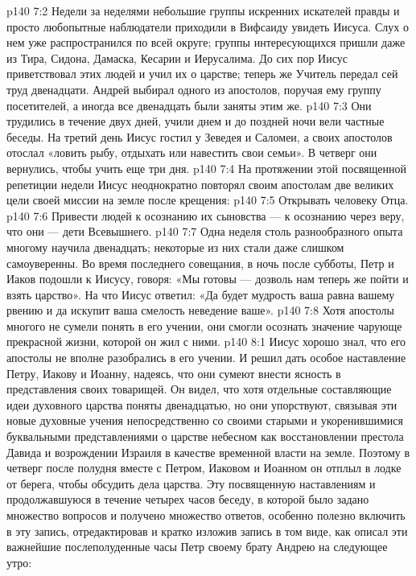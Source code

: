 \vs p140 7:2 \pc Недели за неделями небольшие группы искренних искателей правды и просто любопытные наблюдатели приходили в Вифсаиду увидеть Иисуса. Слух о нем уже распространился по всей округе; группы интересующихся пришли даже из Тира, Сидона, Дамаска, Кесарии и Иерусалима. До сих пор Иисус приветствовал этих людей и учил их о царстве; теперь же Учитель передал сей труд двенадцати. Андрей выбирал одного из апостолов, поручая ему группу посетителей, а иногда все двенадцать были заняты этим же.
\vs p140 7:3 Они трудились в течение двух дней, учили днем и до поздней ночи вели частные беседы. На третий день Иисус гостил у Зеведея и Саломеи, а своих апостолов отослал «ловить рыбу, отдыхать или навестить свои семьи». В четверг они вернулись, чтобы учить еще три дня.
\vs p140 7:4 На протяжении этой посвященной репетиции недели Иисус неоднократно повторял своим апостолам две великих цели своей миссии на земле после крещения:
\vs p140 7:5 \bibnobreakspace Открывать человеку Отца.
\vs p140 7:6 \bibnobreakspace Привести людей к осознанию их сыновства --- к осознанию через веру, что они --- дети Всевышнего.
\vs p140 7:7 \pc Одна неделя столь разнообразного опыта многому научила двенадцать; некоторые из них стали даже слишком самоуверенны. Во время последнего совещания, в ночь после субботы, Петр и Иаков подошли к Иисусу, говоря: «Мы готовы --- дозволь нам теперь же пойти и взять царство». На что Иисус ответил: «Да будет мудрость ваша равна вашему рвению и да искупит ваша смелость неведение ваше».
\vs p140 7:8 Хотя апостолы многого не сумели понять в его учении, они смогли осознать значение чарующе прекрасной жизни, которой он жил с ними.
\vs p140 8:1 Иисус хорошо знал, что его апостолы не вполне разобрались в его учении. И решил дать особое наставление Петру, Иакову и Иоанну, надеясь, что они сумеют внести ясность в представления своих товарищей. Он видел, что хотя отдельные составляющие идеи духовного царства поняты двенадцатью, но они упорствуют, связывая эти новые духовные учения непосредственно со своими старыми и укоренившимися буквальными представлениями о царстве небесном как восстановлении престола Давида и возрождении Израиля в качестве временной власти на земле. Поэтому в четверг после полудня вместе с Петром, Иаковом и Иоанном он отплыл в лодке от берега, чтобы обсудить дела царства. Эту посвященную наставлениям и продолжавшуюся в течение четырех часов беседу, в которой было задано множество вопросов и получено множество ответов, особенно полезно включить в эту запись, отредактировав и кратко изложив запись в том виде, как описал эти важнейшие послеполуденные часы Петр своему брату Андрею на следующее утро:
